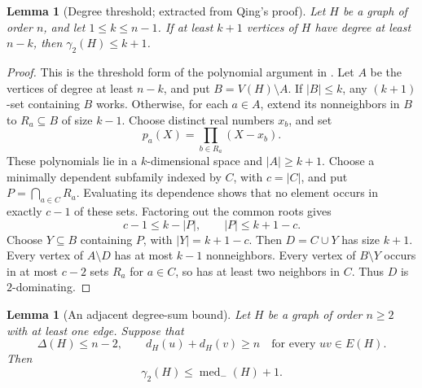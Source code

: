 \documentclass[11pt,a4paper]{article}
\newtheorem{lemma}[theorem]{Lemma}
\theoremstyle{remark}
\begin{document}
\begin{lemma}[Degree threshold; extracted from Qing's proof]
\label{r6h:threshold}
Let $H$ be a graph of order $n$, and let $1\le k\le n-1$.
If at least $k+1$ vertices of $H$ have degree at least $n-k$, then
$\gamma_2(H)\le k+1$.
\end{lemma}

\begin{proof}
This is the threshold form of the polynomial argument in
\cite{Qing26}.  Let $A$ be the vertices of degree at least $n-k$,
and put $B=V(H)\setminus A$.
If $|B|\le k$, any $(k+1)$-set containing $B$ works.
Otherwise, for each $a\in A$, extend its nonneighbors in $B$ to
$R_a\subseteq B$ of size $k-1$.
Choose distinct real numbers $x_b$, and set
\[
 p_a(X)=\prod_{b\in R_a}(X-x_b).
\]
These polynomials lie in a $k$-dimensional space and $|A|\ge k+1$.
Choose a minimally dependent subfamily indexed by $C$, with $c=|C|$,
and put $P=\bigcap_{a\in C}R_a$.
Evaluating its dependence shows that no element occurs in exactly
$c-1$ of these sets.
Factoring out the common roots gives
\[
 c-1\le k-|P|,\qquad |P|\le k+1-c.
\]
Choose $Y\subseteq B$ containing $P$, with $|Y|=k+1-c$.
Then $D=C\cup Y$ has size $k+1$.
Every vertex of $A\setminus D$ has at most $k-1$ nonneighbors.
Every vertex of $B\setminus Y$ occurs in at most $c-2$ sets $R_a$
for $a\in C$, so has at least two neighbors in $C$.
Thus $D$ is $2$-dominating.
\end{proof}

\begin{lemma}[An adjacent degree-sum bound]
\label{r6h:edgesum}
Let $H$ be a graph of order $n\ge2$ with at least one edge.
Suppose that
\begin{equation}
 \label{r6h:edgesumhyp}
 \Delta(H)\le n-2,
 \qquad d_H(u)+d_H(v)\ge n
 \quad\text{for every }uv\in E(H).
\end{equation}
Then
\begin{equation}
 \label{r6h:edgesumbound}
 \gamma_2(H)\le\operatorname{med}_{-}(H)+1.
\end{equation}
\end{lemma}
\end{document}

